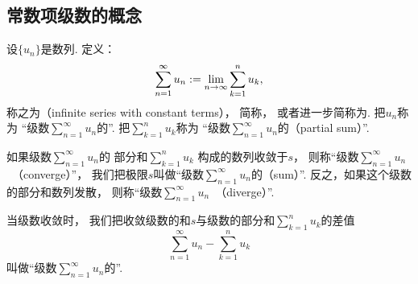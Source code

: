 \subsection{常数项级数的概念}
\begin{definition}\label{definition:无穷级数.常数项级数的定义}
设\(\{u_n\}\)是数列.
定义：\[
	\sum_{n=1}^\infty u_n
	:=
	\lim_{n\to\infty} \sum_{k=1}^n u_k,
\]
称之为（infinite series with constant terms），
简称，
或者进一步简称为.
把\(u_n\)称为
“级数\(\sum_{n=1}^\infty u_n\)的”.
把\(\sum_{k=1}^n u_k\)称为
“级数\(\sum_{n=1}^\infty u_n\)的（partial sum）”.

如果级数\(\sum_{n=1}^\infty u_n\)的
部分和\(\sum_{k=1}^n u_k\)
构成的数列收敛于\(s\)，
则称“级数\(\sum_{n=1}^\infty u_n\)~（converge）”，
我们把极限\(s\)叫做“级数\(\sum_{n=1}^\infty u_n\)的（sum）”.
反之，如果这个级数的部分和数列发散，
则称“级数\(\sum_{n=1}^\infty u_n\)~（diverge）”.

当级数收敛时，
我们把收敛级数的和\(s\)与级数的部分和\(\sum_{k=1}^n u_k\)的差值\[
	\sum_{n=1}^\infty u_n - \sum_{k=1}^n u_k
\]
叫做“级数\(\sum_{n=1}^\infty u_n\)的”.
\end{definition}

